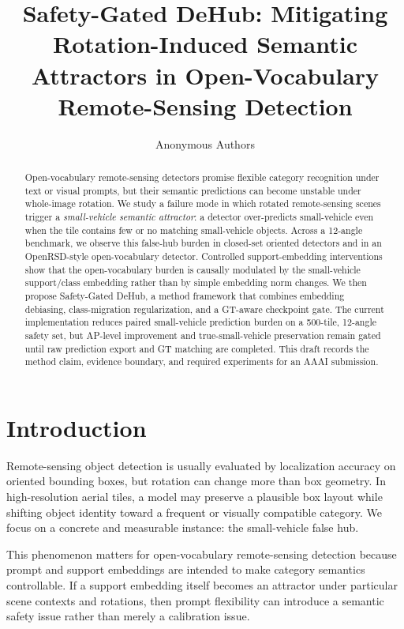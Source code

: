 \documentclass[letterpaper]{article}
\title{Safety-Gated DeHub: Mitigating Rotation-Induced Semantic Attractors in Open-Vocabulary Remote-Sensing Detection}
\author{Anonymous Authors}
\newcommand{\ours}{Safety-Gated DeHub}
\newcommand{\sv}{small-vehicle}
\begin{document}
\maketitle

\begin{abstract}
Open-vocabulary remote-sensing detectors promise flexible category recognition under text or visual prompts, but their semantic predictions can become unstable under whole-image rotation. We study a failure mode in which rotated remote-sensing scenes trigger a \emph{small-vehicle semantic attractor}: a detector over-predicts \sv{} even when the tile contains few or no matching \sv{} objects. Across a 12-angle benchmark, we observe this false-hub burden in closed-set oriented detectors and in an OpenRSD-style open-vocabulary detector. Controlled support-embedding interventions show that the open-vocabulary burden is causally modulated by the \sv{} support/class embedding rather than by simple embedding norm changes. We then propose \ours{}, a method framework that combines embedding debiasing, class-migration regularization, and a GT-aware checkpoint gate. The current implementation reduces paired \sv{} prediction burden on a 500-tile, 12-angle safety set, but AP-level improvement and true-\sv{} preservation remain gated until raw prediction export and GT matching are completed. This draft records the method claim, evidence boundary, and required experiments for an AAAI submission.
\end{abstract}

\section{Introduction}

Remote-sensing object detection is usually evaluated by localization accuracy on oriented bounding boxes, but rotation can change more than box geometry. In high-resolution aerial tiles, a model may preserve a plausible box layout while shifting object identity toward a frequent or visually compatible category. We focus on a concrete and measurable instance: the \sv{} false hub.

This phenomenon matters for open-vocabulary remote-sensing detection because prompt and support embeddings are intended to make category semantics controllable. If a support embedding itself becomes an attractor under particular scene contexts and rotations, then prompt flexibility can introduce a semantic safety issue rather than merely a calibration issue.
\end{document}

